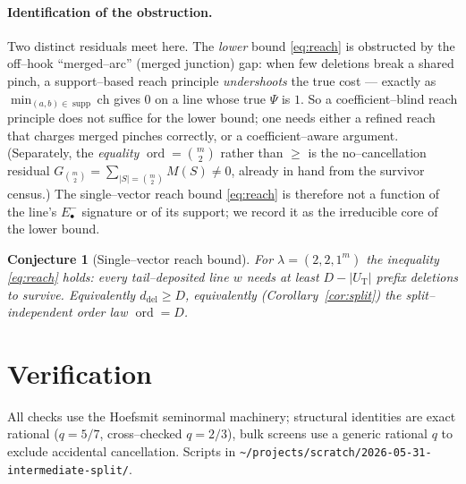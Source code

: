 \documentclass[11pt]{article}
\newtheorem{conjecture}[theorem]{Conjecture}
\theoremstyle{definition}
\DeclareMathOperator{\supp}{supp}
\DeclareMathOperator{\ord}{ord}
\newcommand{\Em}[1]{E^{-}_{#1}}
\newcommand{\ddel}{d_{\mathrm{del}}}
\begin{document}
\paragraph{Identification of the obstruction.} Two distinct residuals meet here. The
\emph{lower} bound \eqref{eq:reach} is obstructed by the off--hook ``merged--arc'' (merged
junction) gap: when few deletions break a shared pinch, a support--based reach principle
\emph{undershoots} the true cost --- exactly as $\min_{(a,b)\in\supp}\mathrm{ch}$ gives $0$ on a
line whose true $\Psi$ is $1$. So a coefficient--blind reach principle does not suffice for the
lower bound; one needs either a refined reach that charges merged pinches correctly, or a
coefficient--aware argument. (Separately, the \emph{equality} $\ord=\binom m2$ rather than $\ge$
is the no--cancellation residual $G_{\binom m2}=\sum_{|S|=\binom m2}M(S)\neq0$, already in hand
from the survivor census.) The single--vector reach bound \eqref{eq:reach} is therefore not a
function of the line's $\Em\bullet$ signature or of its support; we record it as the irreducible
core of the lower bound.

\begin{conjecture}[Single--vector reach bound]\label{conj:reach}
For $\lambda=(2,2,1^m)$ the inequality \eqref{eq:reach} holds: every tail--deposited line $w$
needs at least $D-|U_{\mathrm T}|$ prefix deletions to survive. Equivalently
$\ddel\ge D$, equivalently (Corollary~\ref{cor:split}) the split--independent order law $\ord=D$.
\end{conjecture}

\section{Verification}\label{sec:verify}

All checks use the Hoefsmit seminormal machinery; structural identities are exact rational
($q=5/7$, cross--checked $q=2/3$), bulk screens use a generic rational $q$ to exclude accidental
cancellation. Scripts in \texttt{\~{}/projects/scratch/2026-05-31-intermediate-split/}.
\end{document}
